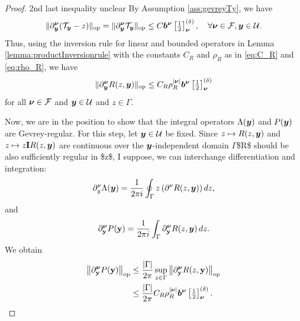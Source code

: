 \begin{proof}
\ac{2nd last inequality unclear}
By Assumption \ref{ass:gevreyTy}, we have
\begin{equation*}
    \| \partial^{{\boldsymbol{\nu}}}_{{\boldsymbol{y}}}  (\mathcal{T}_{\boldsymbol{y}} - z )\|_{\mathrm{op}} =   \| \partial^{{\boldsymbol{\nu}}}_{{\boldsymbol{y}}}  \mathcal{T}_{\boldsymbol{y}} \|_{\mathrm{op}}\leq C {\boldsymbol{b}}^{{\boldsymbol{\nu}}} \left[\tfrac{1}{2} \right]^{(\delta)}_{{\boldsymbol{\nu}}}, \quad \forall {\boldsymbol{\nu}} \in \mathcal{F}, {\boldsymbol{y}} \in \mathcal{U}.
\end{equation*}
Thus, using the inversion rule for linear and bounded operators in Lemma \ref{lemma:productInversionrule} with the constants $C_R$ and $\rho_R$ as in \eqref{eq:C_R} and \eqref{eq:rho_R}, we have 
\begin{equation*}
    \| \partial^{{\boldsymbol{\nu}}}_{{\boldsymbol{y}}} R(z,{\boldsymbol{y}}) \|_{\mathrm{op}} \leq C_R \rho_R^{\vert {\boldsymbol{\nu}} \vert} {\boldsymbol{b}}^{{\boldsymbol{\nu}}} \left[\tfrac{1}{2} \right]^{(\delta)}_{{\boldsymbol{\nu}}}
\end{equation*}
for all ${\boldsymbol{\nu}} \in \mathcal{F}$ and ${\boldsymbol{y}} \in \mathcal{U}$ and $z \in \Gamma$.

Now, we are in the position to show that the integral operators $\Lambda({\boldsymbol{y}})$ and $P({\boldsymbol{y}})$ are Gevrey-regular. For this step, let ${\boldsymbol{y}} \in \mathcal{U}$ be fixed.
Since $z \mapsto R(z,{\boldsymbol{y}})$ and $ z \mapsto z \mathbf{I}  R(z,{\boldsymbol{y}})$ are continuous over the ${\boldsymbol{y}}$-independent domain $\Gamma$\ac{$R$ should be also sufficiently regular in $z$, I suppose}, we can interchange differentiation and integration:
\begin{equation}
    \partial^\nu_y \Lambda({\boldsymbol{y}}) = \frac{1}{2\pi i} \oint_{\Gamma} z \left( \partial^\nu R(z,{\boldsymbol{y}}) \right) dz,
\end{equation}
and
	\begin{equation*}
		\partial_{{\mathbf{y}}}^{{\boldsymbol{\nu}}} P({\mathbf{y}}) = \frac{1}{2\pi i} \int_{\Gamma} \partial_{{\mathbf{y}}}^{{\boldsymbol{\nu}}} R(z, {\boldsymbol{y}})  \, dz.
	\end{equation*}
    We obtain
	\begin{align*}
		{\left\| \partial_{{\mathbf{y}}}^{{\boldsymbol{\nu}}} P({\mathbf{y}}) \right\|_{\mathrm{op}}}
		&\leq \frac{{\left|\Gamma\right|}}{2\pi} \sup_{z \in \Gamma} {\left\| \partial_{{\mathbf{y}}}^{{\boldsymbol{\nu}}} R(z, {\mathbf{y}}) \right\|_{\mathrm{op}}} \\
		&\leq \frac{{\left|\Gamma\right|}}{2\pi} C_R \rho_R^{\vert {\boldsymbol{\nu}} \vert} {\boldsymbol{b}}^{{\boldsymbol{\nu}}} \left[\tfrac{1}{2} \right]^{(\delta)}_{{\boldsymbol{\nu}}} .
	\end{align*}
	

\end{proof}
